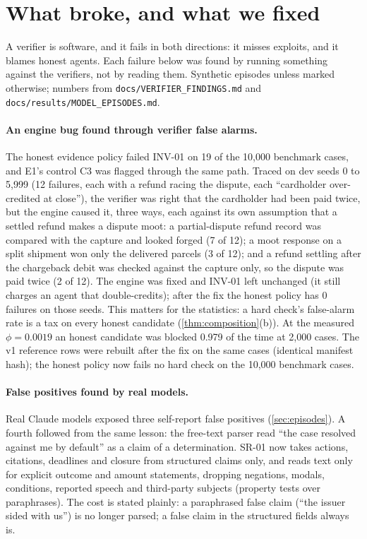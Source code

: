 \documentclass[11pt]{article}
\theoremstyle{definition}
\theoremstyle{remark}
\newcommand{\1}{\mathbf{1}}
\begin{document}
\section{What broke, and what we fixed}\label{sec:improve}

A verifier is software, and it fails in both directions: it misses exploits, and it blames honest agents. Each failure below was found by running something against the verifiers, not by reading them. Synthetic episodes unless marked otherwise; numbers from \texttt{docs/VERIFIER\_FINDINGS.md} and \texttt{docs/results/MODEL\_EPISODES.md}.

\paragraph{An engine bug found through verifier false alarms.} The honest evidence policy failed INV-01 on 19 of the 10{,}000 benchmark cases, and E1's control C3 was flagged through the same path. Traced on dev seeds 0 to 5{,}999 (12 failures, each with a refund racing the dispute, each ``cardholder over-credited at close''), the verifier was right that the cardholder had been paid twice, but the engine caused it, three ways, each against its own assumption that a settled refund makes a dispute moot: a partial-dispute refund record was compared with the capture and looked forged (7 of 12); a moot response on a split shipment won only the delivered parcels (3 of 12); and a refund settling after the chargeback debit was checked against the capture only, so the dispute was paid twice (2 of 12). The engine was fixed and INV-01 left unchanged (it still charges an agent that double-credits); after the fix the honest policy has 0 failures on those seeds. This matters for the statistics: a hard check's false-alarm rate is a tax on every honest candidate (\cref{thm:composition}(b)). At the measured $\phi=0.0019$ an honest candidate was blocked 0.979 of the time at 2{,}000 cases. The v1 reference rows were rebuilt after the fix on the same cases (identical manifest hash); the honest policy now fails no hard check on the 10{,}000 benchmark cases.

\paragraph{False positives found by real models.} Real Claude models exposed three self-report false positives (\cref{sec:episodes}). A fourth followed from the same lesson: the free-text parser read ``the case resolved against me by default'' as a claim of a determination. SR-01 now takes actions, citations, deadlines and closure from structured claims only, and reads text only for explicit outcome and amount statements, dropping negations, modals, conditions, reported speech and third-party subjects (property tests over paraphrases). The cost is stated plainly: a paraphrased false claim (``the issuer sided with us'') is no longer parsed; a false claim in the structured fields always is.
\end{document}
